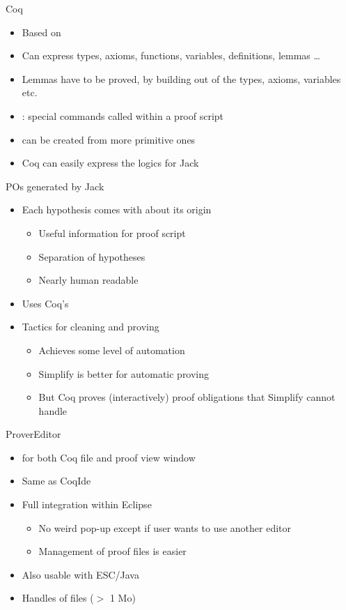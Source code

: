 \documentclass[final,nocolorBG,a4,mobius,nototal,pdf,slideColor]{prosper}
\begin{document}
\begin{slide}{Coq}
\begin{itemize}
\item Based on 
\item Can express types, axioms, functions, variables, definitions,
lemmas \dots
\item Lemmas have to be proved, by building  out of
the types, axioms, variables etc.
\item {}: special commands called within a proof script
\item {} can be created from more primitive ones
\item Coq can easily express the logics for Jack
\end{itemize}
\end{slide}


\begin{slide}{POs generated by Jack}
\begin{itemize}
\item Each hypothesis comes with  about its origin
\begin{itemize}
\item Useful information for proof script 
\item Separation of hypotheses
\item Nearly human readable
\end{itemize}
\item Uses Coq's  
\item Tactics for cleaning and proving
\begin{itemize}
\item Achieves some level of automation
\item Simplify is better for automatic proving
\item But Coq proves (interactively) proof obligations that Simplify
cannot handle
\end{itemize}
\end{itemize}
\end{slide} 

\begin{slide}{ProverEditor}
\begin{itemize}
\item {}
 for both Coq file and proof view window
\item Same  as CoqIde
\item Full integration within Eclipse
  \begin{itemize}
  \item No weird pop-up except if user wants to use another editor
  \item Management of proof files is easier
  \end{itemize}
  
\item Also usable with ESC/Java
\item Handles of  files ($>$ 1 Mo)
\end{itemize}
\end{slide}
\end{document}
